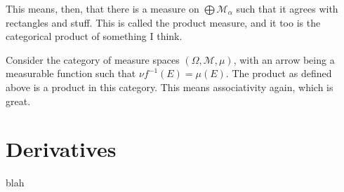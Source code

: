 \documentclass{article}
\theoremstyle{definition}
\newcommand{\M}{\mathcal{M}}
\begin{document}
	This means, then, that there is a measure on $\bigoplus \M_\alpha$ such that it agrees with rectangles and stuff. This is called the product measure, and it too is the categorical product of something I think.
	
	Consider the category of measure spaces $(\Omega, \M, \mu)$, with an arrow being a measurable function such that $\nu f^{-1} (E) = \mu(E)$. The product as defined above is a product in this category. This means associativity again, which is great.
	
	\section{Derivatives}
	
	blah
\end{document}
